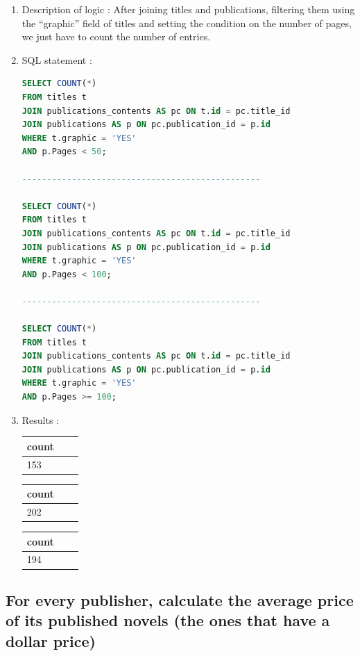 \documentclass[doubleside, titlepage]{article}
\begin{document}
	\begin{enumerate}
	\item Description of logic : After joining titles and publications, filtering them using the “graphic” field of titles and setting the condition on the number of pages, we just have to count the number of entries.
	\item SQL statement :
		\begin{lstlisting}[language=SQL,showspaces=false,basicstyle=\ttfamily,numberstyle=\tiny,commentstyle=\color{gray}]
SELECT COUNT(*)
FROM titles t
JOIN publications_contents AS pc ON t.id = pc.title_id
JOIN publications AS p ON pc.publication_id = p.id
WHERE t.graphic = 'YES'
AND p.Pages < 50;

------------------------------------------------

SELECT COUNT(*)
FROM titles t
JOIN publications_contents AS pc ON t.id = pc.title_id
JOIN publications AS p ON pc.publication_id = p.id
WHERE t.graphic = 'YES'
AND p.Pages < 100;

------------------------------------------------

SELECT COUNT(*)
FROM titles t
JOIN publications_contents AS pc ON t.id = pc.title_id
JOIN publications AS p ON pc.publication_id = p.id
WHERE t.graphic = 'YES'
AND p.Pages >= 100;
		\end{lstlisting}

	\item Results :\\

	\begin{tabular}{|l|c|r|}
	  \hline
		count \\
	  \hline
		153\\
	  \hline
	\end{tabular}

	\begin{tabular}{|l|c|r|}
	  \hline
		count \\
	  \hline
		202\\
	  \hline
	\end{tabular}

	\begin{tabular}{|l|c|r|}
	  \hline
		count \\
	  \hline
		194\\
	  \hline
	\end{tabular}

\end{enumerate}

\subsection{For every publisher, calculate the average price of its published novels (the ones that have a dollar price)}
\end{document}
